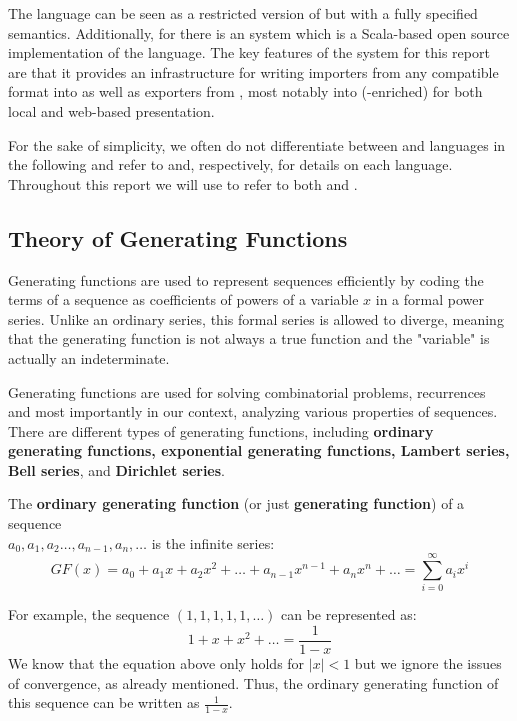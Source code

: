 The \mmt \cite{RabKoh:WSMSML13} language can be seen as a restricted version of \omdoc but
with a fully specified semantics. Additionally, for \mmt there is an \mmt system
\cite{Rabe:MAGMS13} which is a Scala-based \cite{scala:webpage} open source implementation
of the {\mmt} language. The key features of the \mmt system for this report are that it
provides an infrastructure for writing importers from any compatible format into \mmt as
well as exporters from \mmt, most notably into (\mathml-enriched) \html for both local and
web-based presentation.

For the sake of simplicity, we often do not differentiate between \mmt and \omdoc
languages in the following and refer to \cite{Kohlhase:OMDoc1.2} and, respectively,
\cite{RabKoh:WSMSML13} for details on each language. Throughout this report we will use
\omdmmt to refer to both \omdoc and \mmt.

\subsection{Theory of Generating Functions}
Generating functions are used to represent sequences efficiently by coding the terms of a sequence
as coefficients of powers of a variable $x$ in a formal power series.
Unlike an ordinary series, this formal series is allowed to diverge, meaning that the generating function is not
always a true function and the "variable" is actually an indeterminate.

Generating functions are used for solving combinatorial problems, recurrences and most importantly in our context,
analyzing various properties of sequences. There are different types of generating functions, including
\textbf{ordinary generating functions, exponential generating functions, Lambert series, Bell series}, and
\textbf{Dirichlet series}.

The \textbf{ordinary generating function} (or just \textbf{generating function}) of a sequence \\ $a_0, a_1, a_2
\ldots, a_{n-1}, a_n, \ldots$ is the infinite series:
\begin{equation}
GF(x) = a_0 + a_1x + a_2x^2 + \ldots + a_{n-1}x^{n-1} + a_nx^n + \ldots = \sum_{i=0}^{\infty} a_ix^i
\end{equation}

For example, the sequence $(1,1,1,1,1, \ldots)$ can be represented as:
\begin{equation}
1 + x + x^2 + \ldots = \frac{1}{1-x}
\end{equation}
We know that the equation above only holds for $|x|<1$ but we ignore the issues of convergence, as already mentioned.
 Thus, the ordinary generating function of this sequence can be written as $\frac{1}{1-x}$.

